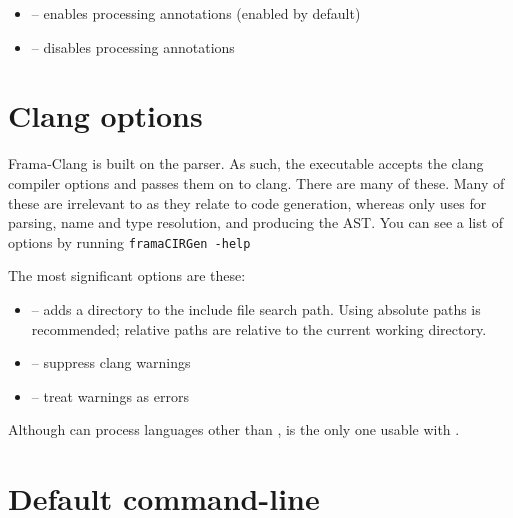 \begin{itemize}
	\item {} -- enables processing \acslpp annotations (enabled by default)
	\item {} -- disables processing \acslpp annotations
	
\end{itemize}

\section{Clang options}

Frama-Clang is built on the \clang \cpp parser. 
As such, the \irg executable accepts the clang
compiler options and passes them on to clang. There are many of these.
Many of these are irrelevant to \fcl as they relate to 
code generation, whereas \fcl only uses \clang for parsing, name
and type resolution, and producing the AST.
You can see a list of options by running 
\lstinline|framaCIRGen -help|

The most significant \cl options are these:
\begin{itemize}
	\item {} -- adds a directory to the include file search path. Using absolute paths is recommended; relative paths are relative to the current working directory.
	\item {} -- suppress clang warnings
	\item {} -- treat warnings as errors
\end{itemize}

Although \clang can process languages other than \cpp, \cpp is the only one usable with \fclang.

\section{Default command-line}

